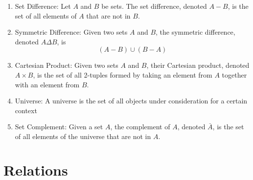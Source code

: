 \documentclass{article}
\begin{document}
\begin{enumerate}
		\item Set Difference: Let $A$ and $B$ be sets.
		The set difference, denoted $A-B$, is the set of all elements of $A$ that are not in $B$.
		
		\item Symmetric Difference: Given two sets $A$ and $B$, the symmetric difference, denoted $A\Delta B$, is
		\[(A-B)\cup (B-A)\]
		
		\item Cartesian Product: Given two sets $A$ and $B$, their Cartesian product, denoted $A\times B$,
		is the set of all 2-tuples formed by taking an element from $A$ together with an element from $B$.
		
		\item Universe: A universe is the set of all objects under consideration for a certain context
		
		\item Set Complement: Given a set $A$, the complement of $A$, denoted $\bar A$, is the set of all elements of the universe that are not in $A$.
	
	
	\end{enumerate}
	
	\section*{Relations}
	
\end{document}

